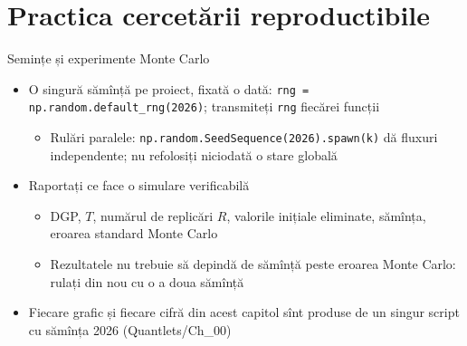 \section{Practica cercetării reproductibile}

\begin{frame}{Semințe și experimente Monte Carlo}
\itemsize{\small}
\begin{itemize}
    \item O singură sămînță pe proiect, fixată o dată: \texttt{rng = np.random.default\_rng(2026)}; transmiteți \texttt{rng} fiecărei funcții
    \begin{itemize}
        \item Rulări paralele: \texttt{np.random.SeedSequence(2026).spawn(k)} dă fluxuri independente; nu refolosiți niciodată o stare globală
    \end{itemize}
    \item Raportați ce face o simulare verificabilă
    \begin{itemize}
        \item DGP, $T$, numărul de replicări $R$, valorile inițiale eliminate, sămînța, eroarea standard Monte Carlo
        \item Rezultatele nu trebuie să depindă de sămînță peste eroarea Monte Carlo: rulați din nou cu o a doua sămînță
    \end{itemize}
    \item Fiecare grafic și fiecare cifră din acest capitol sînt produse de un singur script cu sămînța 2026 (Quantlets/Ch\_00)
\end{itemize}
\end{frame}

